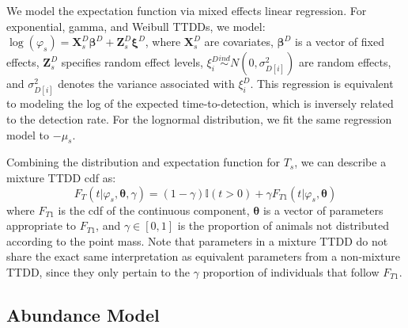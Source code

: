 \documentclass[useAMS,usenatbib,referee,12pt]{article}
\begin{document}
We model the expectation function via mixed effects linear regression.  
For exponential, gamma, and Weibull TTDDs, we model: $\log(\varphi_{s}) = \textbf{X}_{s}^D\boldsymbol{\beta}^D + \textbf{Z}_{s}^D\boldsymbol{\xi}^D$, where $\textbf{X}_{s}^D$ are covariates, $\boldsymbol{\beta}^D$ is a vector of fixed effects, $\textbf{Z}_{s}^D$ specifies random effect levels, $\xi_i^D \overset{ind}{\sim} N(0,\sigma_{D[i]}^2)$ are random effects, and $\sigma_{D[i]}^2$ denotes the variance associated with $\xi_i^D$.  
This regression is equivalent to modeling the log of the expected time-to-detection, which is inversely related to the detection rate.  
For the lognormal distribution, we fit the same regression model to $-\mu_{s}$.  

Combining the distribution and expectation function for $T_{s}$, we can describe a mixture TTDD cdf as:
\[F_T(t|\varphi_s, \boldsymbol{\theta}, \gamma) = (1-\gamma)\mathbb{I}(t>0) + \gamma F_{T1}(t|\varphi_s, \boldsymbol{\theta})\]
where $F_{T1}$ is the cdf of the continuous component, $\boldsymbol{\theta}$ is a vector of parameters appropriate to $F_{T1}$, and $\gamma \in [0,1]$ is the proportion of animals not distributed according to the point mass.
Note that parameters in a mixture TTDD do not share the exact same interpretation as equivalent parameters from a non-mixture TTDD, since they only pertain to the $\gamma$ proportion of individuals that follow $F_{T1}$.




\subsection{Abundance Model}
\end{document}
